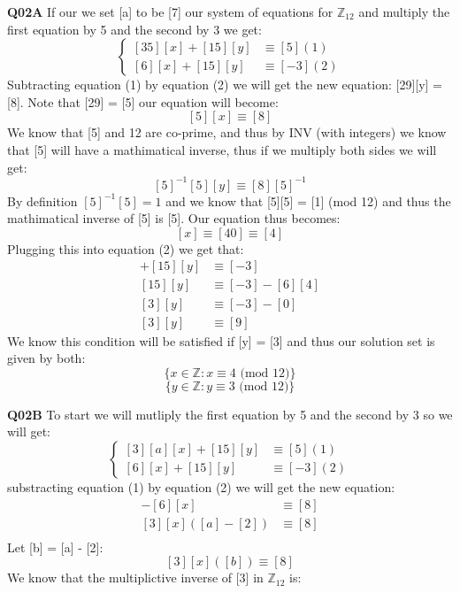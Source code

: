\documentclass[11pt]{article}
\begin{document}
\parindent=0pt

\textbf{Q02A} If our we set [a] to be [7] our system of equations for $\mathbb Z_{12}$ and multiply the first equation by 5 and the second by 3 we get:
$$
\begin{cases}
[35][x] + [15][y] & \equiv [5]       (1)\\
[6][x] + [15][y] & \equiv [-3]      (2)
\end{cases}
$$
Subtracting equation (1) by equation (2) we will get the new equation: [29][y] = [8]. Note that [29] = [5] our equation will become:
\[ [5][x] \equiv [8] \]
We know that [5] and 12 are co-prime, and thus by INV (with integers) we know that [5] will have a mathimatical inverse, thus if we multiply both sides we will get:
\[ [5]^{-1}[5][y] \equiv [8][5]^{-1} \]
By definition $[5]^{-1}[5] = 1$ and we know that [5][5] = [1] (mod 12) and thus the mathimatical inverse of [5] is [5]. Our equation thus becomes:
\[ [x] \equiv [40] \equiv [4] \]
Plugging this into equation (2) we get that:
\begin{align*}
 [6][x] + [15][y] & \equiv [-3]  \\
 [15][y]  & \equiv [-3]  - [6][4] \\
 [3][y]  & \equiv [-3]  - [0] \\
 [3][y]  & \equiv [9]
\end{align*}
We know this condition will be satisfied if [y] = [3] and thus our solution set is given by both: 
\[  \{ x \in \mathbb{Z} : x \equiv 4 \text{  (mod 12)} \} \]
\[  \{ y \in \mathbb{Z} : y \equiv 3 \text{  (mod 12)} \} \]

\textbf{Q02B} To start we will mutliply the first equation by 5 and the second by 3 so we will get:
$$
\begin{cases}
[3][a][x] + [15][y] & \equiv [5]       (1)\\
[6][x] + [15][y] & \equiv [-3]        (2)
\end{cases}
$$
substracting equation (1) by equation (2) we will get the new equation:
\begin{align*}
 [3][a][x] - [6][x] & \equiv [8] \\
 [3][x]([a] - [2]) & \equiv [8] \\
\end{align*}
Let [b] = [a] - [2]:
\[  [3][x]([b]) \equiv [8] \]
We know that the multiplictive inverse of [3] in $\mathbb Z_{12}$ is:
\end{document}

